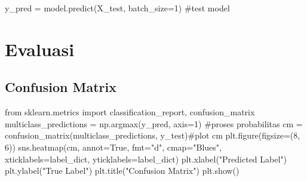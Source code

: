 \documentclass[
  letterpaper,
  DIV=11,
  numbers=noendperiod]{scrreprt}
\newenvironment{Shaded}{\begin{snugshade}}{\end{snugshade}}
\newcommand{\CommentTok}[1]{\textcolor[rgb]{0.37,0.37,0.37}{#1}}
\newcommand{\DecValTok}[1]{\textcolor[rgb]{0.68,0.00,0.00}{#1}}
\newcommand{\ImportTok}[1]{\textcolor[rgb]{0.00,0.46,0.62}{#1}}
\newcommand{\NormalTok}[1]{\textcolor[rgb]{0.00,0.23,0.31}{#1}}
\newcommand{\OperatorTok}[1]{\textcolor[rgb]{0.37,0.37,0.37}{#1}}
\newcommand{\StringTok}[1]{\textcolor[rgb]{0.13,0.47,0.30}{#1}}
\newcommand{\VariableTok}[1]{\textcolor[rgb]{0.07,0.07,0.07}{#1}}
\begin{document}

\begin{Shaded}
\begin{Highlighting}[]
\NormalTok{y\_pred }\OperatorTok{=}\NormalTok{ model.predict(X\_test, batch\_size}\OperatorTok{=}\DecValTok{1}\NormalTok{) }\CommentTok{\#test model}
\end{Highlighting}
\end{Shaded}

\hypertarget{evaluasi-4}{%
\section*{Evaluasi}\label{evaluasi-4}}


\hypertarget{confusion-matrix-1}{%
\subsection*{Confusion Matrix}\label{confusion-matrix-1}}

\begin{Shaded}
\begin{Highlighting}[]
\ImportTok{from}\NormalTok{ sklearn.metrics }\ImportTok{import}\NormalTok{ classification\_report, confusion\_matrix}
\NormalTok{multiclass\_predictions }\OperatorTok{=}\NormalTok{ np.argmax(y\_pred, axis}\OperatorTok{=}\DecValTok{1}\NormalTok{) }\CommentTok{\#proses probabilitas}
\NormalTok{cm }\OperatorTok{=}\NormalTok{ confusion\_matrix(multiclass\_predictions, y\_test)}\CommentTok{\#plot cm}
\NormalTok{plt.figure(figsize}\OperatorTok{=}\NormalTok{(}\DecValTok{8}\NormalTok{, }\DecValTok{6}\NormalTok{))}
\NormalTok{sns.heatmap(cm, annot}\OperatorTok{=}\VariableTok{True}\NormalTok{, fmt}\OperatorTok{=}\StringTok{"d"}\NormalTok{, cmap}\OperatorTok{=}\StringTok{"Blues"}\NormalTok{, xticklabels}\OperatorTok{=}\NormalTok{label\_dict, yticklabels}\OperatorTok{=}\NormalTok{label\_dict)}
\NormalTok{plt.xlabel(}\StringTok{"Predicted Label"}\NormalTok{)}
\NormalTok{plt.ylabel(}\StringTok{"True Label"}\NormalTok{)}
\NormalTok{plt.title(}\StringTok{"Confusion Matrix"}\NormalTok{)}
\NormalTok{plt.show()}
\end{Highlighting}
\end{Shaded}
\end{document}
